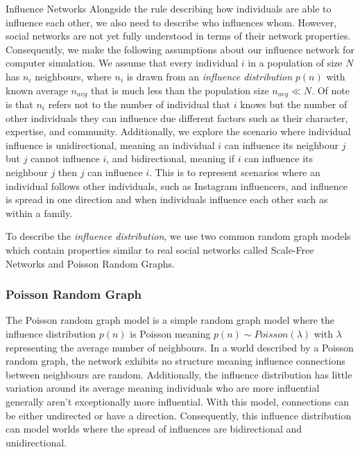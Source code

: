 \documentclass[10pt, oneside, reqno]{amsart}
\makeatletter
\theoremstyle{plain}%
\theoremstyle{definition}
\theoremstyle{remark}
\renewcommand\subsection{\@startsection{subsection}{2}%
  \z@{.5\linespacing\@plus.7\linespacing}{-.5em}%
  {\normalfont\scshape}}
\makeatother
\begin{document}
\subsection{Influence Networks}
Alongside the rule describing how individuals are able to influence each other, we also need to 
describe who influences whom.
However, social networks are not yet fully understood in terms of their network properties. 
Consequently, we make the following assumptions about our influence network for computer 
simulation.
We assume that every individual $i$ in a population of size $N$ has $n_i$ neighbours, where 
$n_i$ is drawn from an \textit{influence distribution} $p(n)$ with known average $n_{avg}$ that is much less 
than the population size $n_{avg} \ll N$.
Of note is that $n_i$ refers not to the number of individual that $i$ knows but the number of 
other individuals they can influence due different factors such as their character, expertise, 
and community.
Additionally, we explore the scenario where individual influence is unidirectional, meaning 
an individual $i$ can influence its neighbour $j$ but $j$ cannot influence $i$, and 
bidirectional, meaning if $i$ can influence its neighbour $j$ then $j$ can influence $i$. 
This is to represent scenarios where an individual follows other individuals, such as Instagram 
influencers, and influence is spread in one direction and when individuals influence each 
other such as within a family.

To describe the \textit{influence distribution}, we use two common random graph models 
which contain properties similar to real social networks called Scale-Free Networks and 
Poisson Random Graphs.


\subsubsection{Poisson Random Graph}
The Poisson random graph model is a simple random graph model where the influence distribution $p(n)$ is Poisson meaning $p(n) \sim Poisson(\lambda)$ with $\lambda$ representing the average number of neighbours. In a world described by a Poisson random graph, the network exhibits no structure meaning influence connections between neighbours are random. 
Additionally, the influence distribution has little variation around its average meaning individuals who are more influential generally aren't exceptionally more influential.
With this model, connections can be either undirected or have a direction.
Consequently, this influence distribution can model worlds where the spread of influences are bidirectional and unidirectional.
\end{document}
